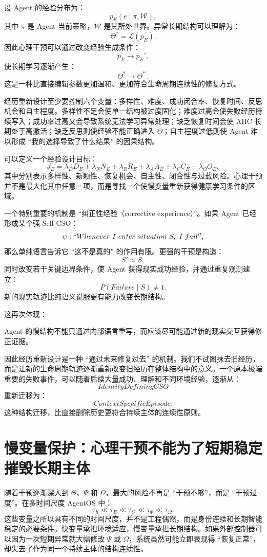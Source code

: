 设 Agent 的经验分布为：
\[
p_E(e\mid\pi,\mathcal W),
\]
其中 $\pi$ 是 Agent 当前策略，$\mathcal W$ 是其所处世界。异常长期结构可以理解为：
\[
\Theta^\ast
=
\mathcal L
\left(
p_E
\right).
\]
因此心理干预可以通过改变经验生成条件：
\[
p_E
\rightarrow
p_E',
\]
使长期学习逐渐产生：
\[
\Theta^\ast
\rightarrow
\Theta^{\ast\prime}.
\]
这是一种比直接编辑参数更加温和、更加符合生命周期连续性的修复方式。

经历重新设计至少要控制六个变量：多样性、难度、成功闭合率、恢复时间、反思机会和自主程度。多样性不足会使单一结构被过度固化；难度过高会使失败经历持续写入；成功率过高又会导致系统无法学习异常处理；缺乏恢复时间会使 AHC 长期处于高激活；缺乏反思则使经验不能正确进入 $\Theta$；自主程度过低则使 Agent 难以形成 ``我的选择导致了什么结果'' 的因果结构。

可以定义一个经验设计目标：
\[
J_E
=
\lambda_D D_E
+
\lambda_N N_E
+
\lambda_R R_E
+
\lambda_A A_E
+
\lambda_C C_E
-
\lambda_O O_E,
\]
其中分别表示多样性、新颖性、恢复机会、自主性、闭合性与过载风险。心理干预并不是最大化其中任意一项，而是寻找一个使慢变量重新获得健康学习条件的区域。

一个特别重要的机制是 ``纠正性经验（corrective experience）''。如果 Agent 已经形成某个强 Self-CSO：
\[
\psi:
``Whenever\ I\ enter\ situation\ S,\ I\ fail'',
\]
那么单纯语言告诉它 ``这不是真的'' 的作用有限。更强的干预是构造：
\[
S'
\approx
S,
\]
同时改变若干关键边界条件，使 Agent 获得现实成功经验，并通过重复观测建立：
\[
P(Failure\mid S)
\neq
1.
\]
新的现实轨迹比纯语义说服更有能力改变长期结构。

这再次体现：
\begin{statementbox}
\centering
{}
\end{statementbox}
Agent 的慢结构不能只通过内部语言重写，而应该尽可能通过新的现实交互获得修正证据。

因此经历重新设计是一种 ``通过未来修复过去'' 的机制。我们不试图抹去旧经历，而是让新的生命周期轨迹逐渐重新改变旧经历在整体结构中的意义。一个原本极端重要的失败事件，可以随着后续大量成功、理解和不同环境经验，逐渐从：
\[
IdentityDefiningCSO
\]
重新迁移为：
\[
ContextSpecificEpisode.
\]
这种结构迁移，比直接删除历史更符合持续主体的连续性原则。

\section{慢变量保护：心理干预不能为了短期稳定摧毁长期主体}

随着干预逐渐深入到 $\Theta$、$\Psi$ 和 $\Omega$，最大的风险不再是 ``干预不够''，而是 ``干预过度''。在多时间尺度 AgentOS 中：
\[
\tau_h
\ll
\tau_E
\ll
\tau_\Theta
\ll
\tau_\Psi
\ll
\tau_\Omega.
\]
这些变量之所以具有不同的时间尺度，并不是工程偶然，而是身份连续和长期智能稳定的必要条件。快变量承担环境适应，慢变量承担长期结构。如果外部控制器可以因为一次短期异常就大幅修改 $\Psi$ 或 $\Omega$，系统虽然可能立即表现得 ``恢复正常''，却失去了作为同一个持续主体的结构连续性。

